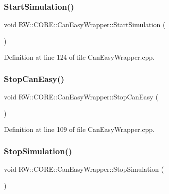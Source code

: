 \subsubsection{\texorpdfstring{Start\+Simulation()}{StartSimulation()}}
{\footnotesize\ttfamily void R\+W\+::\+C\+O\+R\+E\+::\+Can\+Easy\+Wrapper\+::\+Start\+Simulation (\begin{DoxyParamCaption}{ }\end{DoxyParamCaption})\hspace{0.3cm}{\ttfamily [private]}}



Definition at line 124 of file Can\+Easy\+Wrapper.\+cpp.

\hypertarget{class_r_w_1_1_c_o_r_e_1_1_can_easy_wrapper_a2cdc4ca7e44bb4305455460743cf2496}{}\label{class_r_w_1_1_c_o_r_e_1_1_can_easy_wrapper_a2cdc4ca7e44bb4305455460743cf2496} 
\subsubsection{\texorpdfstring{Stop\+Can\+Easy()}{StopCanEasy()}}
{\footnotesize\ttfamily void R\+W\+::\+C\+O\+R\+E\+::\+Can\+Easy\+Wrapper\+::\+Stop\+Can\+Easy (\begin{DoxyParamCaption}{ }\end{DoxyParamCaption})\hspace{0.3cm}{\ttfamily [private]}}



Definition at line 109 of file Can\+Easy\+Wrapper.\+cpp.

\hypertarget{class_r_w_1_1_c_o_r_e_1_1_can_easy_wrapper_a05dfab9becd44083a684df4e5f263b3d}{}\label{class_r_w_1_1_c_o_r_e_1_1_can_easy_wrapper_a05dfab9becd44083a684df4e5f263b3d} 
\subsubsection{\texorpdfstring{Stop\+Simulation()}{StopSimulation()}}
{\footnotesize\ttfamily void R\+W\+::\+C\+O\+R\+E\+::\+Can\+Easy\+Wrapper\+::\+Stop\+Simulation (\begin{DoxyParamCaption}{ }\end{DoxyParamCaption})\hspace{0.3cm}{\ttfamily [private]}}



